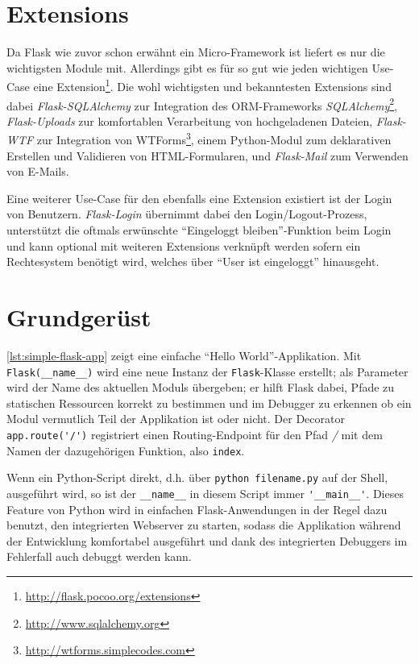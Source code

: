 \section{Extensions}

Da Flask wie zuvor schon erwähnt ein Micro-Framework ist liefert es nur die wichtigsten Module mit.
Allerdings gibt es für so gut wie jeden wichtigen Use-Case eine
Extension\footnote{\href{http://flask.pocoo.org/extensions}{http://flask.pocoo.org/extensions}}. Die
wohl wichtigsten und bekanntesten Extensions sind dabei \emph{Flask-SQLAlchemy} zur Integration des
ORM-Frameworks
\emph{SQLAlchemy}\footnote{\href{http://www.sqlalchemy.org}{http://www.sqlalchemy.org}},
\emph{Flask-Uploads} zur komfortablen Verarbeitung von hochgeladenen Dateien, \emph{Flask-WTF} zur
Integration von
WTForms\footnote{\href{http://wtforms.simplecodes.com}{http://wtforms.simplecodes.com}}, einem
Python-Modul zum deklarativen Erstellen und Validieren von HTML-Formularen, und \emph{Flask-Mail}
zum Verwenden von E-Mails.

Eine weiterer Use-Case für den ebenfalls eine Extension existiert ist der Login von Benutzern.
\emph{Flask-Login} übernimmt dabei den Login/Logout-Prozess, unterstützt die oftmals erwünschte
\enquote{Eingeloggt bleiben}-Funktion beim Login und kann optional mit weiteren Extensions verknüpft
werden sofern ein Rechtesystem benötigt wird, welches über \enquote{User ist eingeloggt} hinausgeht.


\section{Grundgerüst}

\autoref{lst:simple-flask-app} zeigt eine einfache \enquote{Hello World}-Applikation. Mit
\lstinline{Flask(__name__)} wird eine neue Instanz der \lstinline{Flask}-Klasse erstellt; als
Parameter wird der Name des aktuellen Moduls übergeben; er hilft Flask dabei, Pfade zu statischen
Ressourcen korrekt zu bestimmen und im Debugger zu erkennen ob ein Modul vermutlich Teil der
Applikation ist oder nicht. Der Decorator \lstinline{app.route('/')} registriert einen
Routing-Endpoint für den Pfad \emph{/} mit dem Namen der dazugehörigen Funktion, also
\lstinline{index}.

Wenn ein Python-Script direkt, d.h. über \lstinline{python filename.py} auf der Shell, ausgeführt
wird, so ist der \lstinline{__name__} in diesem Script immer \lstinline{'__main__'}. Dieses Feature
von Python wird in einfachen Flask-Anwendungen in der Regel dazu benutzt, den integrierten Webserver
zu starten, sodass die Applikation während der Entwicklung komfortabel ausgeführt und dank des
integrierten Debuggers im Fehlerfall auch debuggt werden kann.

